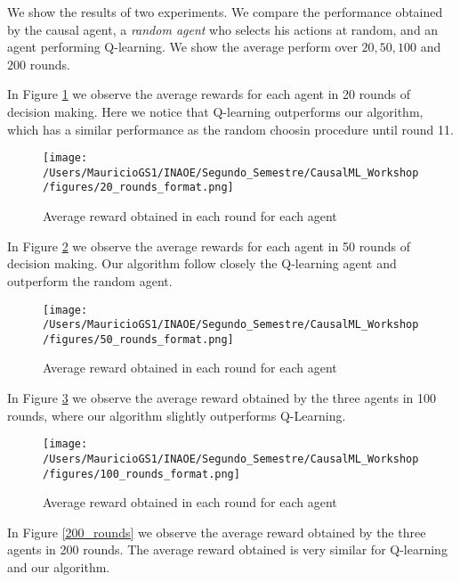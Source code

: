 \documentclass{article}
\begin{document}
We show the results of two experiments. We compare the performance obtained by the causal agent, a \textit{random agent} who selects his actions at random, and an agent performing Q-learning. We show the average perform over $20, 50, 100$ and $200$ rounds.

In Figure \ref{20_rounds} we observe the average rewards for each agent in 20 rounds of decision making. Here we notice that Q-learning outperforms our algorithm, which has a similar performance as the random choosin procedure until round 11.

\begin{figure}[ht]
\vskip 0.2in
\begin{center}
\centerline{\texttt{[image: /Users/MauricioGS1/INAOE/Segundo\_Semestre/CausalML\_Workshop/figures/20\_rounds\_format.png]}}
\caption{Average reward obtained in each round for each agent}
\label{20_rounds}
\end{center}
\vskip -0.2in
\end{figure}

In Figure \ref{50_rounds} we observe the average rewards for each agent in 50 rounds of decision making. Our algorithm follow closely the Q-learning agent and outperform the random agent.

\begin{figure}[ht]
\vskip 0.2in
\begin{center}
\centerline{\texttt{[image: /Users/MauricioGS1/INAOE/Segundo\_Semestre/CausalML\_Workshop/figures/50\_rounds\_format.png]}}
\caption{Average reward obtained in each round for each agent}
\label{50_rounds}
\end{center}
\vskip -0.2in
\end{figure}

In Figure \ref{100_rounds} we observe the average reward obtained by the three agents in 100 rounds, where our algorithm slightly outperforms Q-Learning.

\begin{figure}[ht]
\vskip 0.2in
\begin{center}
\centerline{\texttt{[image: /Users/MauricioGS1/INAOE/Segundo\_Semestre/CausalML\_Workshop/figures/100\_rounds\_format.png]}}
\caption{Average reward obtained in each round for each agent}
\label{100_rounds}
\end{center}
\vskip -0.2in
\end{figure}

In Figure \ref{200_rounds} we observe the average reward obtained by the three agents in 200 rounds. The average reward obtained is very similar for Q-learning and our algorithm.
\end{document}
